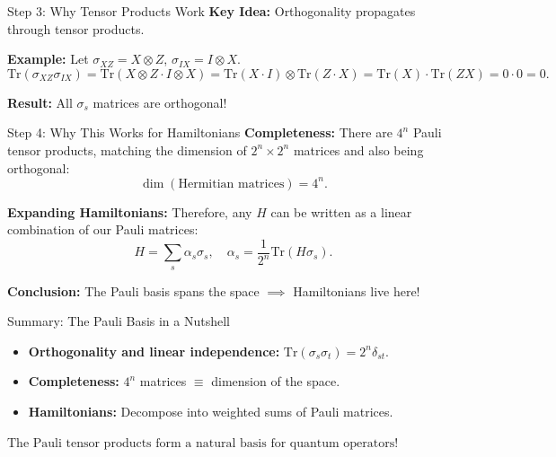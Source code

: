 \documentclass[aspectratio=169,xcolor=dvipsnames]{beamer}
\begin{document}
\begin{frame}{Step 3: Why Tensor Products Work}
\textbf{Key Idea:} Orthogonality propagates through tensor products.

\vspace{0.2cm}
\textbf{Example:} Let \(\sigma_{XZ} = X \otimes Z\), \(\sigma_{IX} = I \otimes X\).
\[
\text{Tr}(\sigma_{XZ} \sigma_{IX}) = \text{Tr}(X \otimes Z \cdot I \otimes X) = \text{Tr}(X \cdot I) \otimes \text{Tr}(Z \cdot X) = \text{Tr}(X) \cdot \text{Tr}(ZX) = 0 \cdot 0 = 0.
\]

\vspace{0.2cm}
\textbf{Result:} All \(\sigma_s\) matrices are orthogonal!
\end{frame}

\begin{frame}{Step 4: Why This Works for Hamiltonians}
\textbf{Completeness:} There are \(4^n\) Pauli tensor products, matching the dimension of \(2^n \times 2^n\) matrices and also being orthogonal:
\[
\dim(\text{Hermitian matrices}) = 4^n.
\]

\vspace{0.2cm}
\textbf{Expanding Hamiltonians:} Therefore, any \(H\) can be written as a linear combination of our Pauli matrices:
\[
H = \sum_{s} \alpha_s \sigma_s, \quad \alpha_s = \frac{1}{2^n} \text{Tr}(H \sigma_s).
\]

\vspace{0.2cm}
\textbf{Conclusion:} The Pauli basis spans the space \(\implies\) Hamiltonians live here!
\end{frame}

\begin{frame}{Summary: The Pauli Basis in a Nutshell}
\begin{itemize}
    \item \textbf{Orthogonality and linear independence:} \(\text{Tr}(\sigma_s \sigma_t) = 2^n \delta_{st}\).
    \item \textbf{Completeness:} \(4^n\) matrices \(\equiv\) dimension of the space.
    \item \textbf{Hamiltonians:} Decompose into weighted sums of Pauli matrices.
\end{itemize}

\vspace{0.5cm}
\centering
\Large
\(\boxed{\text{The Pauli tensor products form a natural basis for quantum operators!}}\)
\end{frame}
\end{document}
